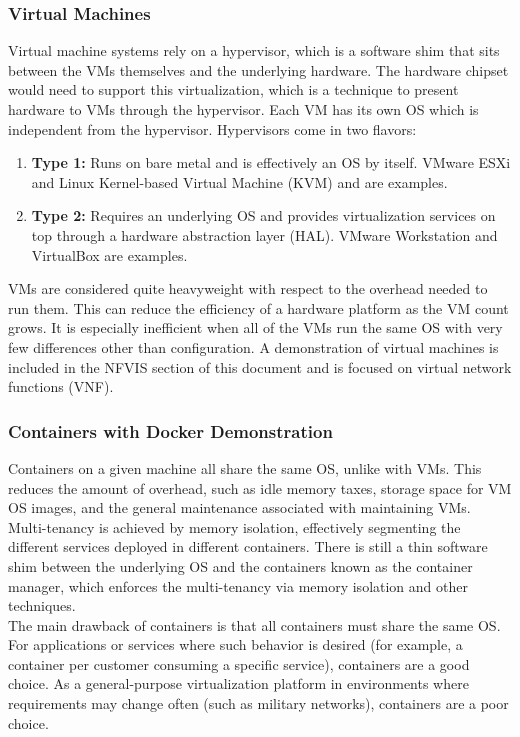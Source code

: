 \subsubsection{Virtual Machines}
Virtual machine systems rely on a hypervisor, which is a software shim that
sits between the VMs themselves and the underlying hardware. The hardware
chipset would need to support this virtualization, which is a technique to
present hardware to VMs through the hypervisor. Each VM has its own OS which
is independent from the hypervisor. Hypervisors come in two flavors:

\begin{enumerate}
  \item \textbf{Type 1:} Runs on bare metal and is effectively an OS by
  itself. VMware ESXi and Linux Kernel-based  Virtual Machine (KVM) and are
  examples.
  \item \textbf{Type 2:} Requires an underlying OS and provides virtualization
  services on top through a hardware abstraction layer (HAL). VMware
  Workstation and VirtualBox are examples.
\end{enumerate}

VMs are considered quite heavyweight with respect to the overhead needed to
run them. This can reduce the efficiency of a hardware platform as the VM
count grows. It is especially inefficient when all of the VMs run the same OS
with very few differences other than configuration. A demonstration of
virtual machines is included in the NFVIS section of this document and is
focused on virtual network functions (VNF).

\subsubsection{Containers with Docker Demonstration}
Containers on a given machine all share the same OS, unlike with VMs. This
reduces the amount of overhead, such as idle memory taxes, storage space for
VM OS images, and the general maintenance associated with maintaining VMs.
Multi-tenancy is achieved by memory isolation, effectively segmenting the
different services deployed in different containers. There is still a thin
software shim between the underlying OS and the containers known as the
container manager, which enforces the multi-tenancy via memory isolation and
other techniques. \\

The main drawback of containers is that all containers must share the same OS\@.
For applications or services where such behavior is desired (for example, a
container per customer consuming a specific service), containers are a good
choice. As a general-purpose virtualization platform in environments where
requirements may change often (such as military networks), containers are a
poor choice. \\

